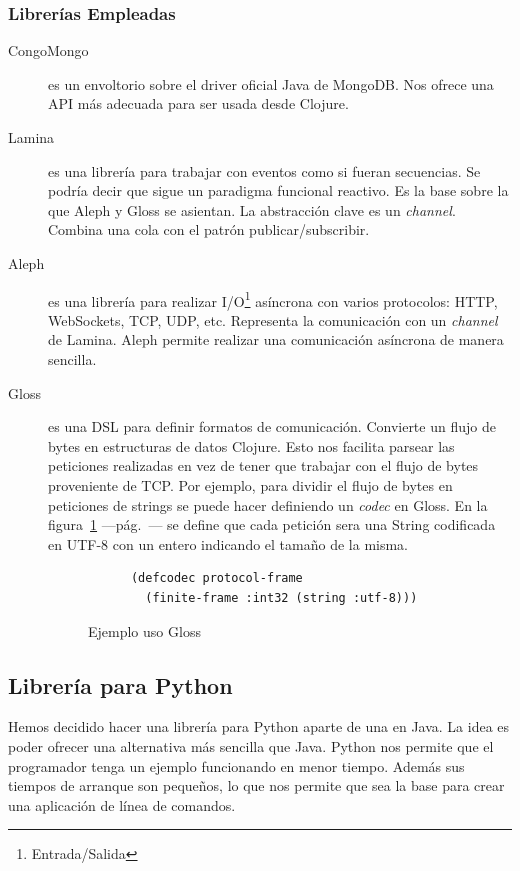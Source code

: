 \subsubsection{Librerías Empleadas}
\begin{description}
\item[CongoMongo]\cite{CONGO-MONGO} es un envoltorio sobre el driver
  oficial Java de MongoDB. Nos ofrece una API más adecuada para ser
  usada desde Clojure.
\item[Lamina] es una librería para trabajar con eventos como si fueran
  secuencias. Se podría decir que sigue un paradigma funcional
  reactivo\cite{FRP}. Es la base sobre la que Aleph y Gloss se
  asientan. La abstracción clave es un \emph{channel}. Combina una
  cola con el patrón publicar/subscribir.
\item[Aleph] es una librería para realizar
  I/O\footnote{Entrada/Salida} asíncrona con varios protocolos: HTTP,
  WebSockets, TCP, UDP, etc. Representa la comunicación con un
  \emph{channel} de Lamina. Aleph permite realizar una comunicación
  asíncrona de manera sencilla.
\item[Gloss] es una DSL para definir formatos de
  comunicación. Convierte un flujo de bytes en estructuras de datos
  Clojure. Esto nos facilita parsear las peticiones realizadas en vez
  de tener que trabajar con el flujo de bytes proveniente de TCP. Por
  ejemplo, para dividir el flujo de bytes en peticiones de strings se
  puede hacer definiendo un \emph{codec} en Gloss. En la
  figura~\ref{gloss-example} ---pág.~\pageref{gloss-example}--- se
  define que cada petición sera una String codificada en UTF-8 con un
  entero indicando el tamaño de la misma.
  \begin{figure}[hb]
    \begin{center}
      \begin{verbatim}
      (defcodec protocol-frame
        (finite-frame :int32 (string :utf-8)))
        \end{verbatim}
    \end{center}
  \caption{Ejemplo uso Gloss}\label{gloss-example}
  \end{figure}
\end{description}

\subsection{Librería para Python}

Hemos decidido hacer una librería para Python aparte de una en
Java. La idea es poder ofrecer una alternativa más sencilla que
Java. Python nos permite que el programador tenga un ejemplo
funcionando en menor tiempo. Además sus tiempos de arranque son
pequeños, lo que nos permite que sea la base para crear una aplicación
de línea de comandos.


